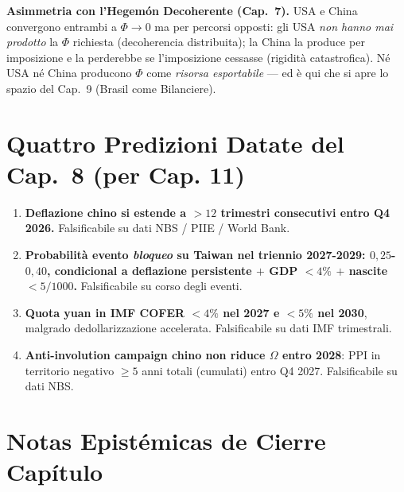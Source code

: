 \Hypoth{} \textbf{Asimmetria con l'Hegemón Decoherente (Cap.~7).} USA e
China convergono entrambi a \(\Phi \to 0\) ma per percorsi opposti: gli
USA \emph{non hanno mai prodotto} la \(\Phi\) richiesta (decoherencia
distribuita); la China la produce per imposizione e la perderebbe se
l'imposizione cessasse (rigidità catastrofica). Né USA né China producono
\(\Phi\) come \emph{risorsa esportabile} --- ed è qui che si apre lo
spazio del Cap.~9 (Brasil come Bilanciere).



\section{Quattro Predizioni Datate del Cap.~8 (per Cap.
11)}\label{quattro-predizioni-datate-del-cap.-8-per-cap.-11}

\begin{enumerate}
\def\labelenumi{\arabic{enumi}.}
\tightlist
\item
  \textbf{Deflazione chino si estende a \(> 12\) trimestri consecutivi
  entro Q4 2026.} Falsificabile su dati NBS / PIIE / World Bank.
\item
  \textbf{Probabilità evento \emph{bloqueo} su Taiwan nel triennio
  2027-2029: \(0{,}25\)-\(0{,}40\), condicional a deflazione
  persistente \(+\) GDP \(< 4\%\) \(+\) nascite \(< 5/1000\).}
  Falsificabile su corso degli eventi.
\item
  \textbf{Quota yuan in IMF COFER \(< 4\%\) nel 2027 e \(< 5\%\) nel
  2030}, malgrado dedollarizzazione accelerata. Falsificabile su dati
  IMF trimestrali.
\item
  \textbf{Anti-involution campaign chino non riduce \(\Omega\) entro
  2028}: PPI in territorio negativo \(\geq 5\) anni totali (cumulati)
  entro Q4 2027. Falsificabile su dati NBS.
\end{enumerate}



\section{Notas Epistémicas de Cierre
Capítulo}\label{note-epistemiche-di-chiusura-capítulo}

